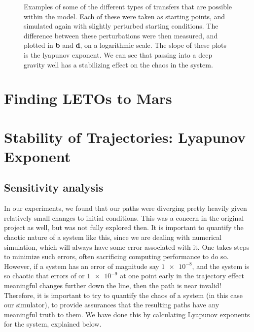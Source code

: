 \begin{figure}
{    }
    \hfill
    \caption{Examples of some of the different types of transfers that are possible within the model. Each of these were taken as starting points, and simulated again with slightly perturbed starting conditions. The difference between these perturbations were then measured, and plotted in \textbf{b} and \textbf{d}, on a logarithmic scale. The slope of these plots is the lyapunov exponent. We can see that passing into a deep gravity well has a stabilizing effect on the chaos in the system.}
    \label{fig:lyapunov} 
\end{figure} 



\section{Finding LETOs to Mars}

\section{Stability of Trajectories: Lyapunov Exponent}
\subsection{Sensitivity analysis}

In our experiments, we found that our paths were diverging pretty heavily given relatively small changes to initial conditions. This was a concern in the original project as well, but was not fully explored then. It is important to quantify the chaotic nature of a system like this, since we are dealing with numerical simulation, which will always have some error associated with it. One takes steps to minimize such errors, often sacrificing computing performance to do so. However, if a system has an error of magnitude say \(\num{1e-8}\), and the system is so chaotic that errors of or \(\num{1e-9}\) at one point early in the trajectory effect meaningful changes further down the line, then the path is near invalid! Therefore, it is important to try to quantify the chaos of a system (in this case our simulator), to provide assurances that the resulting paths have any meaningful truth to them. We have done this by calculating Lyapunov exponents for the system, explained below.

